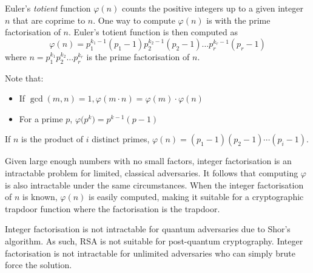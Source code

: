 \documentclass{practice}
\begin{document}
\begin{tcolorbox}[title=Euler's totient (phi) function]
  Euler's \emph{totient} function $\varphi(n)$ counts the positive integers up to a given integer $n$ that are coprime to $n$.
  One way to compute $\varphi(n)$ is with the prime factorisation of $n$.
  Euler's totient function is then computed as
  \[
    \varphi(n) = p_1^{k_1 - 1}(p_1 - 1) p_2^{k_2 - 1}(p_2 - 1) \dots p_r^{k_r - 1}(p_r - 1)
  \]
  where $n = p_1^{k_1}p_2^{k_2}\dots p_r^{k_r}$ is the prime factorisation of $n$.

  Note that:
  \begin{itemize}
    \item If $\gcd(m, n) = 1, \varphi(m\cdot n) = \varphi(m)\cdot\varphi(n)$
    \item For a prime $p$, $\varphi\bigl(p^k\bigr) = p^{k-1}(p-1)$
  \end{itemize}
  \tcblower
  If $n$ is the product of $i$ distinct primes, $\varphi(n) = (p_1 - 1)(p_2 - 1)\cdots(p_i - 1)$.
\end{tcolorbox}

Given large enough numbers with no small factors, integer factorisation is an intractable problem for limited, classical adversaries.
It follows that computing $\varphi$ is also intractable under the same circumstances.
When the integer factorisation of $n$ is known, $\varphi(n)$ is easily computed, making it suitable for a cryptographic trapdoor function where the factorisation is the trapdoor.

Integer factorisation is not intractable for quantum adversaries due to Shor's algorithm.
As such, RSA is not suitable for post-quantum cryptography.
Integer factorisation is not intractable for unlimited adversaries who can simply brute force the solution.
\end{document}
